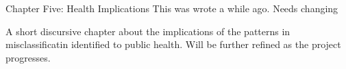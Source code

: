 Chapter Five: Health Implications
This was wrote a while ago. Needs changing

A short discursive chapter about the implications of the patterns in misclassificatin identified to public health. Will be further refined as the project progresses.
